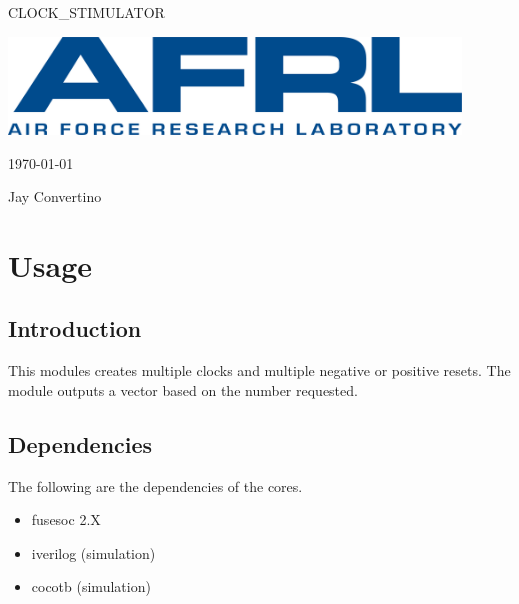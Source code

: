 \begin{titlepage}
  \begin{center}

  {\Huge CLOCK\_STIMULATOR}

  \vspace{25mm}

  \includegraphics[width=0.90\textwidth,height=\textheight,keepaspectratio]{img/AFRL.png}

  \vspace{25mm}

  \today

  \vspace{15mm}

  {\Large Jay Convertino}

  \end{center}
\end{titlepage}

\tableofcontents

\newpage

\section{Usage}

\subsection{Introduction}

\par
This modules creates multiple clocks and multiple negative or positive resets.
The module outputs a vector based on the number requested.

\subsection{Dependencies}

\par
The following are the dependencies of the cores.

\begin{itemize}
  \item fusesoc 2.X
  \item iverilog (simulation)
  \item cocotb (simulation)
\end{itemize}

